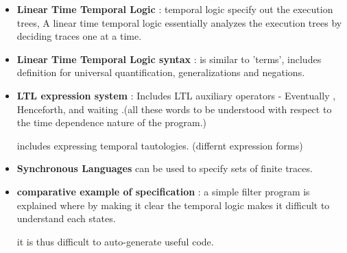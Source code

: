 \begin{itemize}
	\item{\textbf{Linear Time Temporal Logic} : temporal logic specify out the execution trees, A linear time temporal logic essentially analyzes the execution trees by deciding traces one at a time.
	}
	
	\item{\textbf{Linear Time Temporal Logic syntax} : is similar to 'terms', includes definition for universal quantification, generalizations and negations. 
	}
	
	\item{\textbf{LTL expression system} : Includes LTL auxiliary operators - Eventually , Henceforth, and waiting .(all these words to be understood with respect to the time dependence nature of the program.)

	includes expressing temporal tautologies. (differnt expression forms)
	}
	
	\item{\textbf{Synchronous Languages} can be used to specify sets of finite traces.}

	\item{\textbf{comparative example of specification} : 
	a simple filter program is explained where by making it clear the temporal logic makes it difficult to understand each states. 

	it is thus difficult to auto-generate useful code.
	}
	
\end{itemize}
